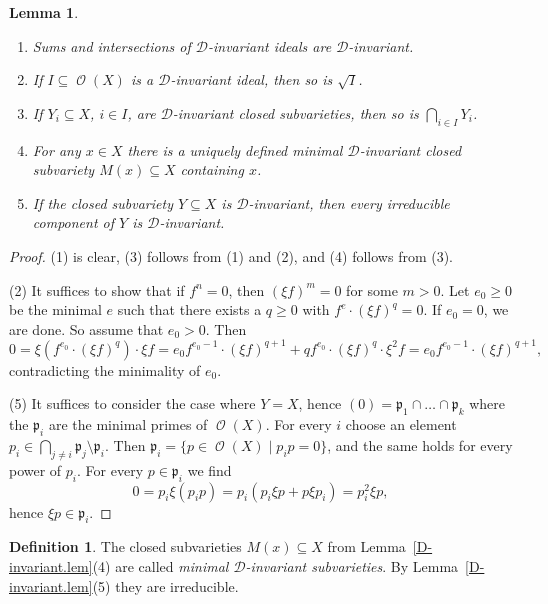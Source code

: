 \documentclass{amsart}
\newtheorem{lem}[thm]{Lemma}
\theoremstyle{definition}
\newtheorem{defn}[thm]{Definition}
\theoremstyle{remark}
\begin{document}
\begin{lem}{\label{D-invariant.lem}}
\begin{enumerate}
\item Sums and intersections of ${\mathcal D}$-invariant ideals are ${\mathcal D}$-invariant.
\item If $I {\subseteq} \operatorname{\mathcal O}(X)$ is a ${\mathcal D}$-invariant ideal, then so is $\sqrt{I}$.
\item If $Y_{i}{\subseteq} X$, $i\in I$, are ${\mathcal D}$-invariant closed subvarieties, then so is $\bigcap_{i\in I}Y_{i}$.
\item For any $x \in X$ there is a uniquely defined minimal ${\mathcal D}$-invariant closed subvariety $M(x)\subseteq X$ containing $x$.
\item If the closed subvariety $Y {\subseteq} X$ is ${\mathcal D}$-invariant, then every irreducible component of $Y$ is ${\mathcal D}$-invariant.
\end{enumerate}
\end{lem}
\begin{proof}
(1) is clear, (3) follows from (1) and (2), and (4) follows from (3).
{\par\smallskip}
(2) It suffices to show that if $f^{n}=0$, then $(\xi f)^{m}=0$ for some $m>0$. Let $e_{0}\geq 0$ be the minimal $e$ such that there exists a $q\geq 0$ with $f^{e}\cdot(\xi f)^{q}=0$. If $e_{0}=0$, we are done. So assume that $e_{0}>0$. Then 
$$
0=\xi(f^{e_{0}}\cdot(\xi f)^{q})\cdot\xi f = e_{0}f^{e_{0}-1}\cdot(\xi f)^{q+1} + q f^{e_{0}}\cdot(\xi f)^{q}\cdot \xi^{2}f 
= e_{0}f^{e_{0}-1}\cdot(\xi f)^{q+1},
$$
contradicting the minimality of $e_{0}$.
{\par\smallskip}
(5) It suffices to consider the case where $Y=X$, hence $(0) = {\mathfrak p}_{1}\cap\ldots\cap {\mathfrak p}_{k}$ where the ${\mathfrak p}_{i}$ are the minimal primes of $\operatorname{\mathcal O}(X)$. For every $i$ choose an element $p_{i}\in\bigcap_{j\neq i}{\mathfrak p}_{j}\setminus{\mathfrak p}_{i}$. Then ${\mathfrak p}_{i}=\{p\in\operatorname{\mathcal O}(X)\mid p_{i} p = 0\}$, and the same holds for every power of $p_{i}$. For every $p \in {\mathfrak p}_{i}$ we find
$$
0 = p_{i} \xi(p_{i} p) = p_{i}(p_{i} \xi p + p\xi p_{i}) = p_{i}^{2} \xi p,
$$
hence $\xi p \in {\mathfrak p}_{i}$. 
\end{proof}

\begin{defn}
The closed subvarieties $M(x) {\subseteq} X$ from Lemma~\ref{D-invariant.lem}(4) are called {\it minimal ${\mathcal D}$-invariant subvarieties}. 
By Lemma~\ref{D-invariant.lem}(5) they are irreducible.
\end{defn}
\end{document}
